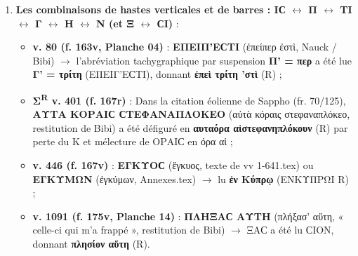 \documentclass[11pt, a4paper, twoside]{article}
\renewcommand{\_}{\origunderscore\penalty0\relax}
\renewcommand{\texttt}[1]{#1}
\newcommand{\R}{\textbf{R}}
\newcommand{\Bibi}{\textit{Bibi}}
\def\R{R}%
\def\Bibi{Bibi}%
\begin{document}
\begin{enumerate}[leftmargin=1.6em, itemsep=2pt]
  \item \textbf{Les combinaisons de hastes verticales et de barres : \texttt{ΙϹ} $\leftrightarrow$ \texttt{Π} $\leftrightarrow$ \texttt{ΤΙ} $\leftrightarrow$ \texttt{Γ} $\leftrightarrow$ \texttt{Η} $\leftrightarrow$ \texttt{Ν} (et \texttt{Ξ} $\leftrightarrow$ \texttt{ϹΙ})} :
  \begin{itemize}[leftmargin=1.5em, itemsep=2pt]
    \item \textbf{v. 80 (\texttt{f. 163v}, Planche 04)} : \textbf{\texttt{ΕΠΕΙΠ'ΕϹΤΙ}} (\texttt{ἐπείπερ ἐστὶ}, Nauck / \Bibi{}) $\to$ l'abréviation tachygraphique par suspension \textbf{\texttt{Π' = περ}} a été lue \textbf{\texttt{Γ' = τρίτη}} (\texttt{ΕΠΕΙΓ'ΕϹΤΙ}), donnant \textbf{\texttt{ἐπεὶ τρίτη 'στὶ}} (\R{}) ;
    \item \textbf{Σ\textsuperscript{R} v. 401 (\texttt{f. 167r})} : Dans la citation éolienne de Sappho (fr. 70/125), \textbf{\texttt{ΑΥΤΑ ΚΟΡΑΙϹ ϹΤΕΦΑΝΑΠΛΟΚΕΟ}} (\texttt{αὐτὰ κόραις στεφαναπλόκεο}, restitution de \Bibi{}) a été défiguré en \textbf{\texttt{αυταόρα αἱστεφανηπλόκουν}} (\R{}) par perte du \texttt{Κ} et mélecture de \texttt{ΟΡΑΙϹ} en \texttt{όρα αἱ} ;
    \item \textbf{v. 446 (\texttt{f. 167v})} : \textbf{\texttt{ΕΓΚΥΟϹ}} (\texttt{ἔγκυος}, texte de \texttt{vv 1-641.tex}) ou \textbf{\texttt{ΕΓΚΥΜΩΝ}} (\texttt{ἐγκύμων}, \texttt{Annexes.tex}) $\to$ lu \textbf{\texttt{ἐν Κύπρῳ}} (\texttt{ΕΝΚΥΠΡΩΙ} \R{}) ;
    \item \textbf{v. 1091 (\texttt{f. 175v}, Planche 14)} : \textbf{\texttt{ΠΛΗΞΑϹ ΑΥΤΗ}} (\texttt{πλήξασ' αὕτη}, « celle-ci qui m'a frappé », restitution de \Bibi{}) $\to$ \texttt{ΞΑϹ} a été lu \texttt{ϹΙΟΝ}, donnant \textbf{\texttt{πλησίον αὕτη}} (\R{}).
  \end{itemize}


\end{enumerate}
\end{document}
